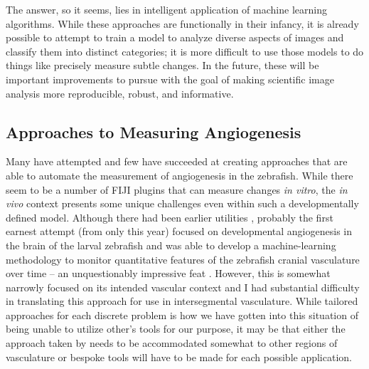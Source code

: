 The answer, so it seems, lies in intelligent application of machine learning algorithms. While these approaches are functionally in their infancy, it is already possible to attempt to train a model to analyze diverse aspects of images and classify them into distinct categories; it is more difficult to use those models to do things like precisely measure subtle changes. In the future, these will be important improvements to pursue with the goal of making scientific image analysis more reproducible, robust, and informative.

\subsection{Approaches to Measuring Angiogenesis}

Many have attempted and few have succeeded at creating approaches that are able to automate the measurement of angiogenesis in the zebrafish. While there seem to be a number of FIJI plugins that can measure changes \textit{in vitro}, the \textit{in vivo} context presents some unique challenges even within such a developmentally defined model. Although there had been earlier utilities \citep{Heath2017}, probably the first earnest attempt (from only this year) focused on developmental angiogenesis in the brain of the larval zebrafish and was able to develop a machine-learning methodology to monitor quantitative features of the zebrafish cranial vasculature over time -- an unquestionably impressive feat \citep{Kugler2022}. However, this is somewhat narrowly focused on its intended vascular context and I had substantial difficulty in translating this approach for use in intersegmental vasculature. While tailored approaches for each discrete problem is how we have gotten into this situation of being unable to utilize other's tools for our purpose, it may be that either the approach taken by \citeauthor{Kugler2022} needs to be accommodated somewhat to other regions of vasculature or bespoke tools will have to be made for each possible application. 

